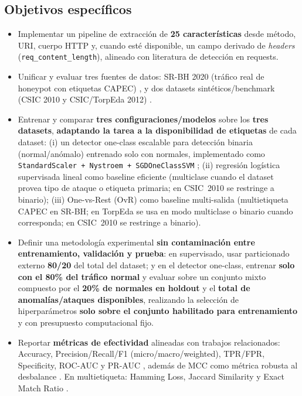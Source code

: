 \documentclass[12pt,oneside]{report}
\begin{document}
\subsection{Objetivos específicos}
\begin{itemize}[leftmargin=*]
  \item Implementar un pipeline de extracción de \textbf{25 características} desde método, URI, cuerpo HTTP y, cuando esté disponible, un campo derivado de \textit{headers} (\texttt{req\_content\_length}), alineado con literatura de detección en requests.
  \item Unificar y evaluar tres fuentes de datos: SR-BH 2020 (tráfico real de honeypot con etiquetas CAPEC) \cite{srbh_dataverse,srbh_paper}, y dos datasets sintéticos/benchmark (CSIC 2010 y CSIC/TorpEda 2012) \cite{csic2010_impact,csic2010_doc,torpeda_2012}.
  \item Entrenar y comparar \textbf{tres configuraciones/modelos} sobre los \textbf{tres datasets}, \textbf{adaptando la tarea a la disponibilidad de etiquetas} de cada dataset: (i) un detector one-class escalable para detección binaria (normal/anómalo) entrenado solo con normales, implementado como \texttt{StandardScaler + Nystroem + SGDOneClassSVM} \cite{sklearn_sgd_ocsvm,sklearn_kernel_approx}; (ii) regresión logística supervisada lineal como baseline eficiente \cite{islr_logreg,sklearn_logreg} (multiclase cuando el dataset provea tipo de ataque o etiqueta primaria; en CSIC~2010 se restringe a binario); (iii) One-vs-Rest (OvR) como baseline multi-salida \cite{tsoumakas_multilabel_overview,rifkin_ova} (multietiqueta CAPEC en SR-BH; en TorpEda se usa en modo multiclase o binario cuando corresponda; en CSIC~2010 se restringe a binario).
  \item Definir una metodología experimental \textbf{sin contaminación entre entrenamiento, validación y prueba}: en supervisado, usar particionado externo \textbf{80/20} del total del dataset; y en el detector one-class, entrenar \textbf{solo con el 80\% del tráfico normal} y evaluar sobre un conjunto mixto compuesto por el \textbf{20\% de normales en holdout} y el \textbf{total de anomalías/ataques disponibles}, realizando la selección de hiperparámetros \textbf{solo sobre el conjunto habilitado para entrenamiento} y con presupuesto computacional fijo.
  \item Reportar \textbf{métricas de efectividad} alineadas con trabajos relacionados: Accuracy, Precision/Recall/F1 (micro/macro/weighted), TPR/FPR, Specificity, ROC-AUC y PR-AUC \cite{saito_pr_auc}, además de MCC como métrica robusta al desbalance \cite{chicco_mcc}. En multietiqueta: Hamming Loss, Jaccard Similarity y Exact Match Ratio \cite{srbh_paper,tsoumakas_multilabel_overview}.

\end{itemize}
\end{document}
